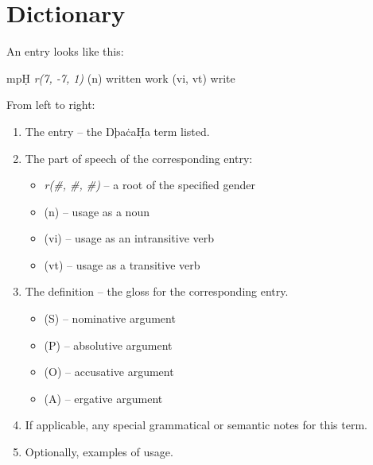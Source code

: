 \documentclass{book}
\newcommand{\lname}{ŊþaċaḤa}
\begin{document}
\chapter{Dictionary}

An entry looks like this:

\textsf{mpḤ} \textit{r(7, -7, 1)}
\quad (n) written work \quad (vi, vt) write

From left to right:

\begin{enumerate}
    \item The entry -- the \lname{} term listed.
    \item The part of speech of the corresponding entry:
    \begin{itemize}
        \item \textit{r(\#, \#, \#)} -- a root of the specified gender
        \item (n) -- usage as a noun
        \item (vi) -- usage as an intransitive verb
        \item (vt) -- usage as a transitive verb
    \end{itemize}
    \item The definition -- the gloss for the corresponding entry.
    \begin{itemize}
        \item (S) -- nominative argument
        \item (P) -- absolutive argument
        \item (O) -- accusative argument
        \item (A) -- ergative argument
    \end{itemize}
    \item If applicable, any special grammatical or semantic notes for this term.
    \item Optionally, examples of usage.
\end{enumerate}

\begin{multicols}{2}
    
\end{multicols}
\end{document}
